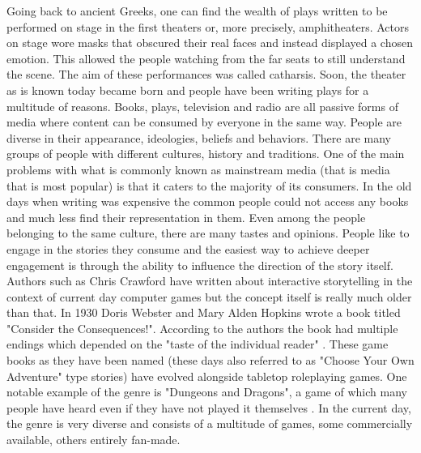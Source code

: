 Going back to ancient Greeks, one can find the wealth of plays written to be performed on stage in the first theaters or, more precisely, amphitheaters.
Actors on stage wore masks that obscured their real faces and instead displayed a chosen emotion.
This allowed the people watching from the far seats to still understand the scene.
The aim of these performances was called catharsis\cite{hart2010art}.
Soon, the theater as is known today became born and people have been writing plays for a multitude of reasons.
Books, plays, television and radio are all passive forms of media where content can be consumed by everyone in the same way.
People are diverse in their appearance, ideologies, beliefs and behaviors.
There are many groups of people with different cultures, history and traditions.
One of the main problems with what is commonly known as mainstream media (that is media that is most popular) is that it caters to the majority of its consumers.
In the old days when writing was expensive the common people could not access any books and much less find their representation in them.
Even among the people belonging to the same culture, there are many tastes and opinions.
People like to engage in the stories they consume and the easiest way to achieve deeper engagement is through the ability to influence the direction of the story itself.
Authors such as Chris Crawford\cite{crawford2013interactive} have written about interactive storytelling in the context of current day computer games but the concept itself is really much older than that.
In 1930 Doris Webster and Mary Alden Hopkins wrote a book titled "Consider the Consequences!".
According to the authors the book had multiple endings which depended on the "taste of the individual reader" \cite{webster1930consequences}.
These game books as they have been named (these days also referred to as "Choose Your Own Adventure" type stories\cite{kraft1981cyoa}) have evolved alongside tabletop roleplaying games.
One notable example of the genre is "Dungeons and Dragons", a game of which many people have heard even if they have not played it themselves \cite{gygax1974dungeons}.
In the current day, the genre is very diverse and consists of a multitude of games, some commercially available, others entirely fan-made.

